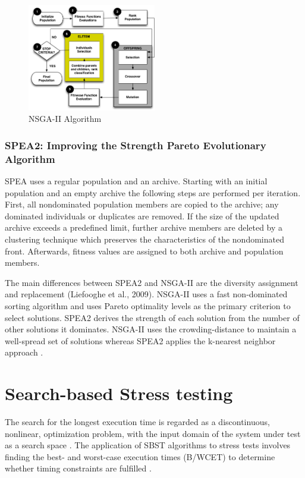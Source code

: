 \documentclass{report}
\begin{document}
\begin{figure}[h]
\centering
\includegraphics[width=0.5\textwidth]{./images/NSGA-2.png}
\caption{NSGA-II Algorithm}
\label{fig:nsga2}
\end{figure}

\subsubsection{SPEA2: Improving the Strength Pareto Evolutionary Algorithm}

SPEA uses a regular population and an archive. Starting with an initial population and an empty archive the following steps are performed per iteration. First, all nondominated population members are copied to the archive; any dominated individuals or duplicates are removed. If the size of the updated archive exceeds a predefined limit, further archive members are deleted by a clustering technique which preserves the characteristics of the nondominated front. Afterwards, fitness values are assigned to both archive and population members.

The main differences between SPEA2 and NSGA-II are the diversity assignment and replacement (Liefooghe et al., 2009). NSGA-II uses a fast non-dominated sorting algorithm and uses Pareto optimality levels as the primary criterion to select solutions. SPEA2 derives the strength of each solution from the number of other solutions it dominates. NSGA-II uses the crowding-distance to maintain a well-spread set of solutions whereas SPEA2 applies the k-nearest neighbor approach \cite{Tervonen2017}.



\section{Search-based Stress testing}

The search for the longest execution time is regarded as a discontinuous, nonlinear, optimization problem, with the input domain of the system under test as a search space \cite{Sullivan}.  The application of SBST algorithms to  stress tests involves finding the best- and worst-case execution times (B/WCET) to determine whether timing constraints are fulfilled \cite{Afzal2009a}. 
\end{document}

